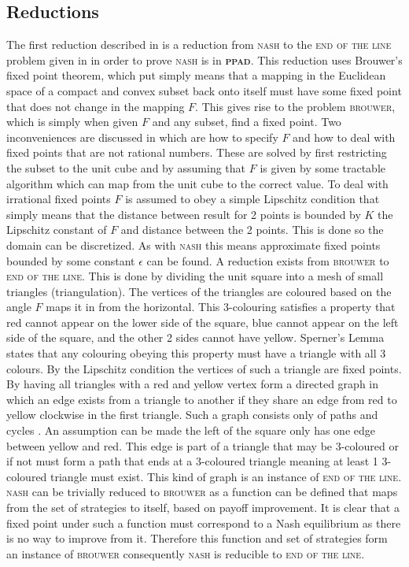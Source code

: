 \documentclass{article}
\begin{document}
\begin{multicols}{2}
\section{Reductions}
The first reduction described in \cite{Daskalakis.2009} is a reduction from \textsc{nash} to the \textsc{end of the line} problem given in \cite{Daskalakis.2009} in order to prove \textsc{nash} is in \textbf{\textsc{ppad}}. This reduction uses Brouwer's fixed point theorem, which put simply means that a mapping in the Euclidean space of a compact and convex subset back onto itself must have some fixed point that does not change in the mapping $F$. This gives rise to the problem \textsc{brouwer}, which is simply when given $F$ and any subset, find a fixed point. Two inconveniences are discussed in \cite{Daskalakis.2009} which are how to specify $F$ and how to deal with fixed points that are not rational numbers. These are solved by first restricting the subset to the unit cube and by assuming that $F$ is given by some tractable algorithm which can map from the unit cube to the correct value. To deal with irrational fixed points $F$ is assumed to obey a simple Lipschitz condition that simply means that the distance between result for 2 points is bounded by $K$ the Lipschitz constant of $F$ and distance between the 2 points. This is done so the domain can be discretized. As with \textsc{nash} this means approximate fixed points bounded by some constant $\epsilon$ can be found. A reduction exists from \textsc{brouwer} to \textsc{end of the line}\cite{Daskalakis.2009}. This is done by dividing the unit square into a mesh of small triangles (triangulation). The vertices of the triangles are coloured based on the angle $F$ maps it in from the horizontal. This 3-colouring satisfies a property that red cannot appear on the lower side of the square, blue cannot appear on the left side of the square, and the other 2 sides cannot have yellow. Sperner's Lemma states that any colouring obeying this property must have a triangle with all 3 colours. By the Lipschitz condition the vertices of such a triangle are fixed points. By having all triangles with a red and yellow vertex form a directed graph in which an edge exists from a triangle to another if they share an edge from red to yellow clockwise in the first triangle. Such a graph consists only of paths and cycles \cite{Daskalakis.2009}. An assumption can be made the left of the square only has one edge between yellow and red. This edge is part of a triangle that may be 3-coloured or if not must form a path that ends at a 3-coloured triangle meaning at least 1 3-coloured triangle must exist. This kind of graph is an instance of \textsc{end of the line}\cite{Daskalakis.2009}. \textsc{nash} can be trivially reduced to \textsc{brouwer} as a function can be defined that maps from the set of strategies to itself, based on payoff improvement. It is clear that a fixed point under such a function must correspond to a Nash equilibrium as there is no way to improve from it. Therefore this function and set of strategies form an instance of \textsc{brouwer} consequently \textsc{nash} is reducible to \textsc{end of the line}.\par

\end{multicols}
\end{document}
